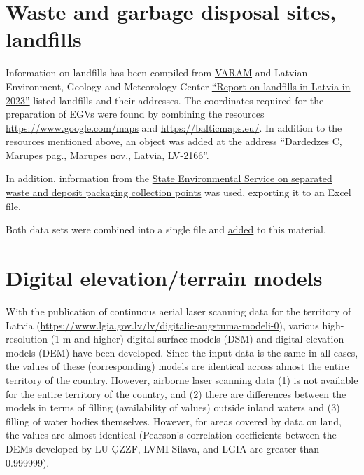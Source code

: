 \documentclass[
]{book}
\begin{document}
\section{Waste and garbage disposal sites, landfills}\label{Ch04.14}

Information on landfills has been compiled from \href{https://www.varam.gov.lv/sites/varam/files/content/files/atkritumu_poligoni_lv_karte.pdf}{VARAM} and
Latvian Environment, Geology and Meteorology Center
\href{https://videscentrs.lvgmc.lv/files/Vide/Atkritumi_un_radiacijas_objekti/Nr_3_parskats_par_atkritumiem/3Atkritumi_kopsavilkums_2023.pdf}{``Report on landfills in Latvia in 2023''} listed landfills and their addresses. The coordinates required
for the preparation of EGVs were found by combining the
resources \url{https://www.google.com/maps} and \url{https://balticmaps.eu/}. In addition to
the resources mentioned above, an object was added at the address
``Dardedzes C, Mārupes pag., Mārupes nov., Latvia, LV-2166''.

In addition, information from the \href{https://skiroviegli.lv/\#/}{State Environmental Service on
separated waste and deposit packaging collection points}
was used, exporting it to an Excel file.

Both data sets were combined into a single file
and \href{https://github.com/aavotins/HiQBioDiv_EGVs/blob/main/Data/Geodata/2024/GarbageWasteLandfills/Atkritumi.xlsx}{added} to this material.

\section{Digital elevation/terrain models}\label{Ch04.15}

With the publication of continuous aerial laser scanning data for the territory of Latvia (\url{https://www.lgia.gov.lv/lv/digitalie-augstuma-modeli-0}), various
high-resolution (1 m and higher) digital surface models (DSM) and
digital elevation models (DEM) have been developed. Since the input data is the
same in all cases, the values of these (corresponding) models are identical
across almost the entire territory of the country. However, airborne laser
scanning data (1) is not available for the entire territory of the country,
and (2) there are differences between the models in terms of filling (availability
of values) outside inland waters and (3) filling of water bodies themselves.
However, for areas covered by data on land, the values are almost
identical (Pearson's correlation coefficients between the DEMs developed
by LU ĢZZF, LVMI Silava, and LĢIA are greater than 0.999999).
\end{document}
